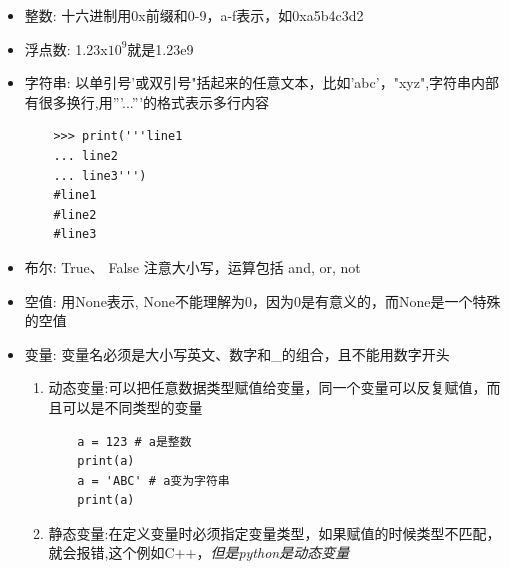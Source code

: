 \documentclass[UTF8,a4paper,8pt]{ctexart}
\begin{document}
		  \begin{itemize}
			  	\item  整数: 十六进制用0x前缀和0-9，a-f表示，如0xa5b4c3d2
			  	\item  浮点数: 1.23x$10^9$就是1.23e9
			  	\item  字符串: 以单引号'或双引号"括起来的任意文本，比如'abc'，"xyz",字符串内部有很多换行,用'''...'''的格式表示多行内容
				  	\begin{lstlisting}
	>>> print('''line1
	... line2
	... line3''')
	#line1
	#line2
	#line3			  		
				  	\end{lstlisting}
			  	\item  布尔: True、 False  注意大小写，运算包括 and, or, not
			  	\item  空值: 用None表示, None不能理解为0，因为0是有意义的，而None是一个特殊的空值
			  	\item  变量: 变量名必须是大小写英文、数字和\_的组合，且不能用数字开头
			  	
					  \begin{enumerate}
					  	\item 动态变量:可以把任意数据类型赋值给变量，同一个变量可以反复赋值，而且可以是不同类型的变量
						  	\begin{lstlisting}
	a = 123 # a是整数
	print(a)
	a = 'ABC' # a变为字符串
	print(a)						  	
						  	\end{lstlisting}
					  	\item 静态变量:在定义变量时必须指定变量类型，如果赋值的时候类型不匹配，就会报错,这个例如C++，\textit{但是python是动态变量}
					  	

\end{enumerate}
\end{itemize}
\end{document}
